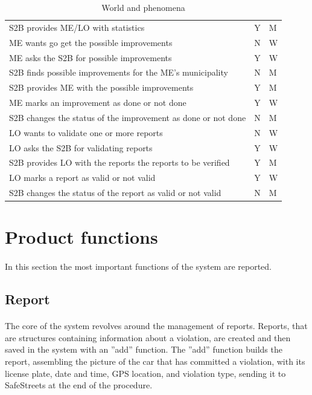 \begin{table}[!h]
\begin{center}
\begin{tabular}{L{0.73\textwidth}P{0.1\textwidth}P{0.059\textwidth}}
								S2B provides ME/LO with statistics & Y & M \\[1mm]
								ME wants go get the possible improvements & N & W \\[1mm]
								ME asks the S2B for possible improvements & Y & W \\[1mm]
								S2B finds possible improvements for the ME's municipality & N & M \\[1mm]
								S2B provides ME with the possible improvements & Y & M \\[1mm]
								ME marks an improvement as done or not done & Y & W \\[1mm]
								S2B changes the status of the improvement as done or not done & N & M \\[1mm]
								LO wants to validate one or more reports & N & W \\[1mm]
								LO asks the S2B for validating reports & Y & W \\[1mm]
								S2B provides LO with the reports the reports to be verified & Y & M \\[1mm]
								LO marks a report as valid or not valid & Y & W \\[1mm]
								S2B changes the status of the report as valid or not valid & N & M \\[1mm]
							\bottomrule
						\end{tabular}
					\end{center}
					\caption{World and phenomena}
				\end{table}
		\clearpage
		\section{Product functions}
			\paragraph{}
				In this section the most important functions of the system are reported.
			\subsection{Report}
				\paragraph{}
					The core of the system revolves around the management of reports. Reports, that are structures containing information about a violation, are created and then saved in the system with an ''add'' function. The ''add'' function builds the report, assembling the picture of the car that has committed a violation, with its license plate, date and time, GPS location, and violation type, sending it to SafeStreets at the end of the procedure.  
					

